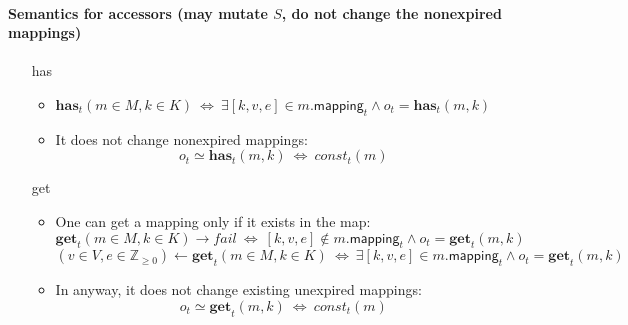 \documentclass{article}
\renewcommand{\o}[1]{\ensuremath{\mathbf{#1}}}
\newcommand{\p}[1]{\ensuremath{\mathit{#1}}}
\newcommand{\s}[1]{\ensuremath{\mathsf{#1}}}
\newcommand{\nintset}{\ensuremath{\mathds{Z}_{\ge 0}}}
\begin{document}
\paragraph{Semantics for accessors (may mutate $S$, do not change the nonexpired mappings)}
\begin{itemize}
   \item[has]
     \begin{itemize}
       \item $\o{has}_t(m \in M, k \in K) ~\Leftrightarrow~ \exists [k,v,e] \in m.\s{mapping}_t \wedge o_t=\o{has}_t(m, k)$\\
       \item It does not change nonexpired mappings:
         $$o_t \simeq \o{has}_t(m, k) ~\Leftrightarrow~ \p{const}_t(m)$$
     \end{itemize}
     \item[get]
       \begin{itemize}
         \item One can get a mapping only if it exists in the map:
           $$\o{get}_t(m \in M, k \in K) \rightarrow fail ~\Leftrightarrow~ [k,v,e] \not\in m.\s{mapping}_t \wedge o_t=\o{get}_t(m, k)$$
           $$(v\in V,e\in \nintset)\gets \o{get}_t(m \in M, k \in K) ~\Leftrightarrow~ \exists [k,v,e] \in m.\s{mapping}_t \wedge o_t=\o{get}_t(m, k)$$
         \item In anyway, it does not change existing unexpired mappings:
           $$o_t \simeq \o{get}_t(m, k) ~\Leftrightarrow~ \p{const}_t(m)$$
       \end{itemize}
\end{itemize}
\end{document}
